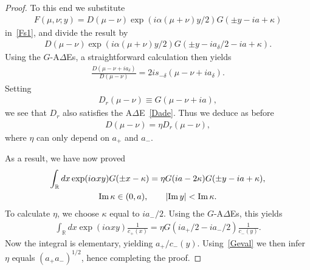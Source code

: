 \documentclass[11pt]{article}
\numberwithin{equation}{section}
\newcommand{\De}{\Delta}
\newcommand{\de}{\delta}
\newcommand{\R}{{\mathbb R}}
\newcommand{\im}{{\rm Im}\, }
\begin{document}
\begin{proof}
To this end we substitute
\begin{gather}
F(\mu,\nu;y)=D(\mu-\nu)\exp(i\alpha (\mu+\nu)y/2)G(\pm y-ia+\kappa)
\end{gather}
in~\eqref{Fs1}, and divide the result by
\begin{gather}
D(\mu-\nu)\exp(i\alpha (\mu+\nu)y/2)G(\pm y-ia_{\de}/2-ia+\kappa).
\end{gather}
Using the $G$-A$\De$Es, a straightforward calculation then yields
\begin{gather}\label{Dade}
\frac{D(\mu-\nu+ia_{\de})}{D(\mu-\nu)}=2is_{-\de}(\mu-\nu+ia_{\de}).
\end{gather}
Setting
\begin{gather}
D_r(\mu-\nu)\equiv G(\mu-\nu+ia),
\end{gather}
we see that $D_r$ also satisf\/ies the A$\De$E~\eqref{Dade}. Thus we deduce as before
\begin{gather}
D(\mu-\nu)=\eta D_r(\mu-\nu),
\end{gather}
where $\eta$ can only depend on $a_{+}$ and $a_{-}$.

As a result, we have now proved
\begin{gather}\label{Ftr}
\int_{\R}dx\exp(i\alpha xy)G(\pm x-\kappa)=\eta G(ia-2\kappa)G(\pm y-ia+\kappa),\\
 \im \kappa \in (0,a),\qquad |\im y|<\im \kappa.\nonumber
\end{gather}
To calculate $\eta$, we choose $\kappa$ equal to $ia_{-}/2$. Using the $G$-A$\De$Es, this yields
\begin{gather}
\int_{\R}dx\exp(i\alpha xy)\frac{1}{c_{+}(x)}=\eta G(ia_{+}/2-ia_{-}/2)\frac{1}{c_{-}(y)}.
\end{gather}
Now the integral is elementary, yielding $a_{+}/c_{-}(y)$. Using~\eqref{Geval} we then infer $\eta$ equals $(a_{+}a_{-})^{1/2}$, hence completing the proof.
\end{proof}
\end{document}
